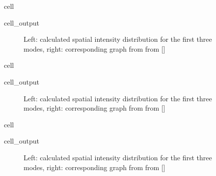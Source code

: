 \documentclass[a4paper,10pt,english,openany,oneside]{jupyterBook}
\begin{document}
\begin{sphinxuseclass}{cell}\begin{sphinxVerbatimOutput}

\begin{sphinxuseclass}{cell_output}
\begin{figure}[htbp]
\centering
\capstart

\noindent{}
\caption{Left: calculated spatial intensity distribution for the first three modes, right: corresponding graph from from {[}{]}}\label{\detokenize{Kogelnik-Shank_Coupled-Wave-Theory_DFB-Lasers:kogelnik12bc}}\end{figure}

\end{sphinxuseclass}\end{sphinxVerbatimOutput}

\end{sphinxuseclass}
\begin{sphinxuseclass}{cell}\begin{sphinxVerbatimOutput}

\begin{sphinxuseclass}{cell_output}
\begin{figure}[htbp]
\centering
\capstart

\noindent{}
\caption{Left: calculated spatial intensity distribution for the first three modes, right: corresponding graph from from {[}{]}}\label{\detokenize{Kogelnik-Shank_Coupled-Wave-Theory_DFB-Lasers:kogelnik12cc}}\end{figure}

\end{sphinxuseclass}\end{sphinxVerbatimOutput}

\end{sphinxuseclass}
\begin{sphinxuseclass}{cell}\begin{sphinxVerbatimOutput}

\begin{sphinxuseclass}{cell_output}
\begin{figure}[htbp]
\centering
\capstart

\noindent{}
\caption{Left: calculated spatial intensity distribution for the first three modes, right: corresponding graph from from {[}{]}}\label{\detokenize{Kogelnik-Shank_Coupled-Wave-Theory_DFB-Lasers:kogelnik12dc}}\end{figure}

\end{sphinxuseclass}\end{sphinxVerbatimOutput}

\end{sphinxuseclass}
\sphinxstepscope
\end{document}
